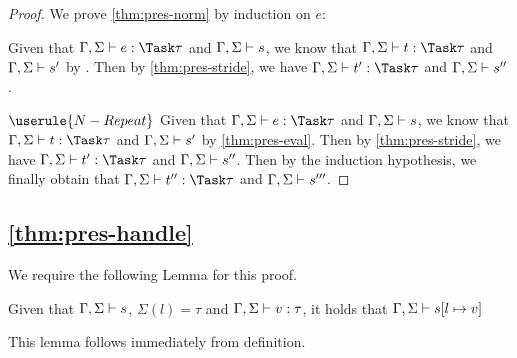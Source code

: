 \begin{proof}
  We prove \cref{thm:pres-norm} by induction on $e$:

    {Given that
    $\Gamma,\Sigma\infers e:\Task\tau$ and $\Gamma,\Sigma\vdash s$, we know that $\Gamma,\Sigma\infers t:\Task\tau$ and $\Gamma,\Sigma\vdash s'$ by
    .
    Then by \cref{thm:pres-stride}, we have $\Gamma,\Sigma\infers t':\Task\tau$ and $\Gamma,\Sigma\vdash s''$.}

  \case
    {$\userule{N-Repeat}$}
    { Given that $\Gamma,\Sigma\infers e:\Task\tau$ and $\Gamma,\Sigma\vdash s$, we know that $\Gamma,\Sigma\infers t:\Task\tau$ and $\Gamma,\Sigma\vdash s'$ by \cref{thm:pres-eval}.
    Then by \cref{thm:pres-stride}, we have $\Gamma,\Sigma\infers t':\Task\tau$ and $\Gamma,\Sigma\vdash s''$.
    Then by the induction hypothesis, we finally obtain that $\Gamma,\Sigma\infers t'':\Task\tau$ and $\Gamma,\Sigma\vdash s'''$.}

\end{proof}



\subsection{\cref{thm:pres-handle}}



We require the following Lemma for this proof.

\begin{lemma}
  Given that $\Gamma,\Sigma\vdash s$, $\Sigma(l)=\tau$ and $\Gamma,\Sigma\vdash v:\tau$, it holds that $\Gamma,\Sigma\vdash s[l\mapsto v]$
  \label{lemmasigmaconsistent}
\end{lemma}
This lemma follows immediately from definition.

